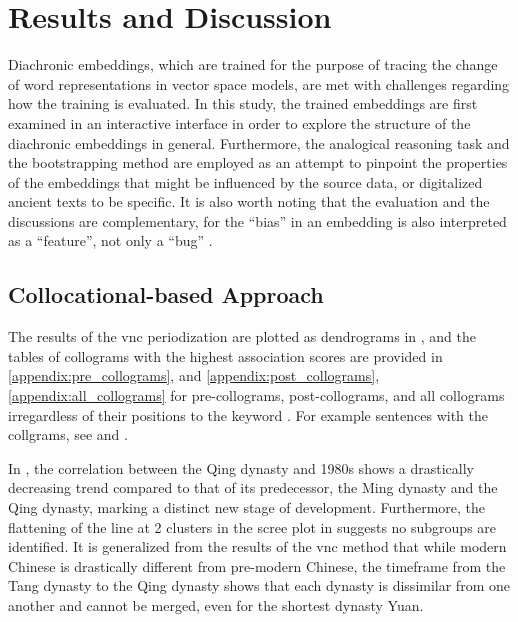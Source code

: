 

\chapter{Results and Discussion}
\label{results}
Diachronic embeddings, which are trained for the purpose of tracing the change of word representations in vector space models, are met with challenges regarding how the training is evaluated. In this study, the trained embeddings are first examined in an interactive interface in order to explore the structure of the diachronic embeddings in general. Furthermore, the analogical reasoning task and the bootstrapping method are employed as an attempt to pinpoint the properties of the embeddings that might be influenced by the source data, or digitalized ancient texts to be specific. It is also worth noting that the evaluation and the discussions are complementary, for the ``bias'' in an embedding is also interpreted as a ``feature'', not only a ``bug'' \parencite{wevers2020digital}.

\section{Collocational-based Approach}
The results of the \gls{vnc} periodization are plotted as dendrograms in , and the tables of collograms with the highest association scores are provided in \ref{appendix:pre_collograms}, and \ref{appendix:post_collograms}, \ref{appendix:all_collograms} for pre-collograms, post-collograms, and all collograms irregardless of their positions to the keyword \jia\rspace. For example sentences with the collgrams, see  and .

In , the correlation between the Qing dynasty and 1980s shows a drastically decreasing trend compared to that of its predecessor, the Ming dynasty and the Qing dynasty, marking a distinct new stage of development. Furthermore, the flattening of the line at 2 clusters in the scree plot in  suggests no subgroups are identified. It is generalized from the results of the \gls{vnc} method that while modern Chinese is drastically different from pre-modern Chinese, the timeframe from the Tang dynasty to the Qing dynasty shows that each dynasty is dissimilar from one another and cannot be merged, even for the shortest dynasty Yuan.

